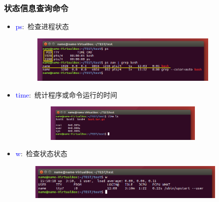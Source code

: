 \frame
{
	\frametitle{状态信息查询命令}
	\begin{itemize}
\setlength{\itemsep}{-15pt}
		\item \textcolor{blue}{ps}:~检查进程状态
\begin{figure}[h!]
\centering
\vspace{-10.5pt}
\includegraphics[height=0.9in,width=3.7in,viewport=0 20 850 230,clip]{Figures/Ubuntu-ps.png}
\label{Linux-command-ps}
\end{figure}
		\item \textcolor{blue}{time}:~统计程序或命令运行的时间
\begin{figure}[h!]
\centering
\vspace{-5.5pt}
\includegraphics[height=0.7in,width=3.7in,viewport=0 20 850 180,clip]{Figures/Ubuntu-time.png}
\label{Linux-command-time}
\end{figure}
		\item \textcolor{blue}{w}:~检查状态状态
\begin{figure}[h!]
\centering
\vspace{-18.5pt}
\includegraphics[height=0.7in,width=3.8in,viewport=0 0 850 150,clip]{Figures/Ubuntu-w.png}
\label{Linux-command-w}
\end{figure}
\end{itemize}
}

